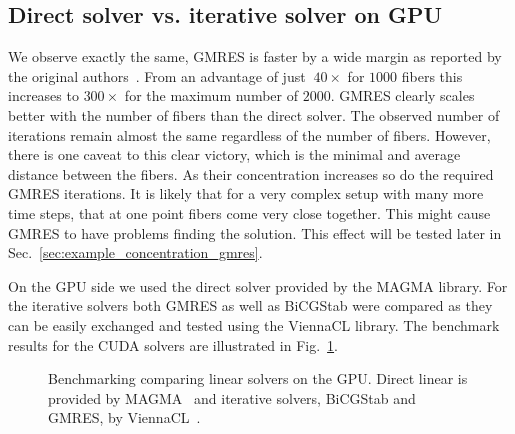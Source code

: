 \subsection{Direct solver vs. iterative solver on GPU}

We observe exactly the same, GMRES is faster by a wide margin as reported by the original authors~\cite{Tornberg2006}. From an advantage of just $~40×$ for $1000$ fibers this increases to $300×$ for the maximum number of $2000$. GMRES clearly scales better with the number of fibers than the direct solver. The observed number of iterations remain almost the same regardless of the number of fibers. However, there is one caveat to this clear victory, which is the minimal and average distance between the fibers. As their concentration increases so do the required GMRES iterations. It is likely that for a very complex setup with many more time steps, that at one point fibers come very close together. This might cause GMRES to have problems finding the solution. This effect will be tested later in Sec.~\ref{sec:example_concentration_gmres}.

On the GPU side we used the direct solver provided by the MAGMA library. For the iterative solvers both GMRES as well as BiCGStab were compared as they can be easily exchanged and tested using the ViennaCL library. The benchmark results for the CUDA solvers are illustrated in Fig.~\ref{fig:bench_cuda_solvers}.

\begin{figure}[!htbp]
  \centering
  \caption[Benchmark linear solvers on GPU.]{Benchmarking comparing linear solvers on the GPU. Direct linear is provided by MAGMA~\cite{MagmaDocumentation} and iterative solvers, BiCGStab and GMRES, by ViennaCL~\cite{ViennaCLRupp2010}.}
  \label{fig:bench_cuda_solvers}
\end{figure}

